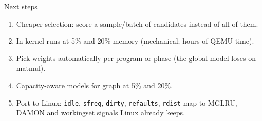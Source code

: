 \documentclass[10pt,aspectratio=169]{beamer}
\begin{document}
\begin{frame}{Next steps}
  \small
  \begin{enumerate}
    \item Cheaper selection: score a sample/batch of candidates instead of all of them.
    \item In-kernel runs at 5\% and 20\% memory (mechanical; hours of QEMU time).
    \item Pick weights automatically per program or phase (the global model loses on matmul).
    \item Capacity-aware models for graph at 5\% and 20\%.
    \item Port to Linux: \texttt{idle}, \texttt{sfreq}, \texttt{dirty}, \texttt{refaults}, \texttt{rdist} map to MGLRU, DAMON and workingset signals Linux already keeps.
  \end{enumerate}
\end{frame}
\end{document}
